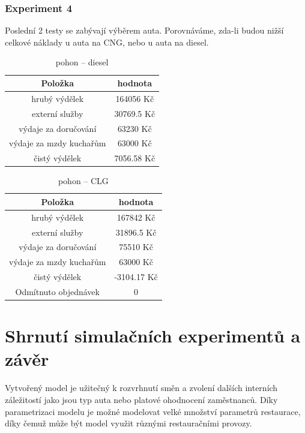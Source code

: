 \documentclass[a4paper, 11pt]{article}
\begin{document}
\newpage


\subsubsection{Experiment 4}

Poslední 2 testy se zabývají výběrem auta. Porovnáváme, zda-li budou nižší celkové náklady u auta na CNG, nebo u auta na diesel. 


\begin{table}[h]
\centering
\begin{tabular}{cc}
\textbf{Položka} & \textbf{hodnota}                                                                                   \\ \hline
hrubý výdělek & 164056 Kč \\ \hline
externí služby  & 30769.5 Kč \\ \hline
výdaje za doručování &  63230 Kč \\ \hline
výdaje za mzdy kuchařům &  63000 Kč \\ \hline
čistý výdělek & 7056.58 Kč\\ \hline
\end{tabular}
\caption{pohon -- diesel}
\end{table}

\begin{table}[h]
\centering
\begin{tabular}{cc}
\textbf{Položka} & \textbf{hodnota}                                                                                   \\ \hline
hrubý výdělek & 167842 Kč \\ \hline
externí služby  & 31896.5 Kč \\ \hline
výdaje za doručování &  75510 Kč \\ \hline
výdaje za mzdy kuchařům &  63000 Kč \\ \hline
čistý výdělek & -3104.17 Kč\\ \hline
Odmítnuto objednávek &  0
\end{tabular}
\caption{pohon -- CLG}
\end{table}



\newpage
\section{Shrnutí simulačních experimentů a závěr}
Vytvořený model je užitečný k rozvrhnutí směn a zvolení dalších interních záležitostí jako jsou typ auta nebo platové ohodnocení zaměstnanců. Díky parametrizaci modelu je možné modelovat velké množství parametrů restaurace, díky čemuž může být model využit různými restauračními provozy. 
\end{document}
